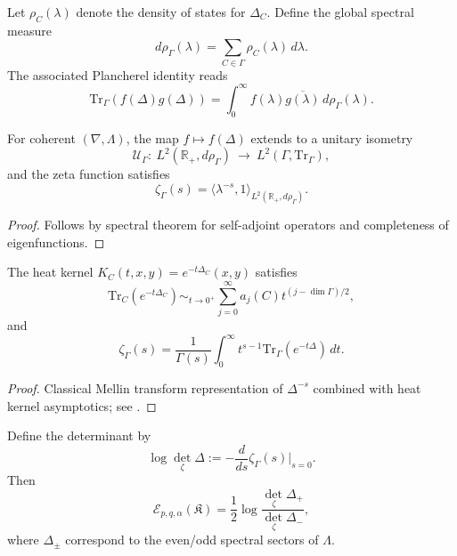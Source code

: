 
\begin{definition}\label{def:spectral-measure}
Let $\rho_C(\lambda)$ denote the density of states for $\Delta_C$. 
Define the global spectral measure
\[
d\rho_\Gamma(\lambda)=\sum_{C\in\Gamma}\rho_C(\lambda)\,d\lambda.
\]
The associated Plancherel identity reads
\[
\mathrm{Tr}_\Gamma(f(\Delta)g(\Delta))
=\int_{0}^{\infty}f(\lambda)\overline{g(\lambda)}\,d\rho_\Gamma(\lambda).
\]
\end{definition}

\begin{theorem}\label{thm:parseval}
For coherent $(\nabla,\Lambda)$, the map 
$f\mapsto f(\Delta)$
extends to a unitary isometry
\[
\mathcal U_\Gamma:\ L^2(\mathbb R_+,d\rho_\Gamma)\ \longrightarrow\ L^2(\Gamma,\mathrm{Tr}_\Gamma),
\]
and the zeta function satisfies
\[
\zeta_\Gamma(s)=\langle \lambda^{-s},1\rangle_{L^2(\mathbb R_+,d\rho_\Gamma)}.
\]
\end{theorem}

\begin{proof}
Follows by spectral theorem for self-adjoint operators and completeness of eigenfunctions. \relax
\end{proof}


\begin{lemma}\label{lem:heat}
The heat kernel $K_C(t,x,y)=e^{-t\Delta_C}(x,y)$ satisfies
\[
\mathrm{Tr}_C(e^{-t\Delta_C})\sim_{t\to0^+}\sum_{j=0}^\infty a_j(C)t^{(j-\dim\Gamma)/2},
\]
and
\[
\zeta_\Gamma(s)=\frac{1}{\Gamma(s)}\int_0^\infty t^{s-1}\mathrm{Tr}_\Gamma(e^{-t\Delta})\,dt.
\]
\end{lemma}

\begin{proof}
Classical Mellin transform representation of $\Delta^{-s}$ combined with heat kernel asymptotics; see \cite{Seeley1967,Grubb1996}. \relax
\end{proof}

\begin{theorem}\label{thm:determinant}
Define the determinant by
\[
\log\det_{\zeta}\Delta := -\frac{d}{ds}\zeta_\Gamma(s)\big|_{s=0}.
\]
Then
\[
\mathcal E_{p,q,\alpha}(\mathfrak K)
=\frac{1}{2}\log\frac{\det_{\zeta}\Delta_+}{\det_{\zeta}\Delta_-},
\]
where $\Delta_\pm$ correspond to the even/odd spectral sectors of $\Lambda$. 
\end{theorem}

